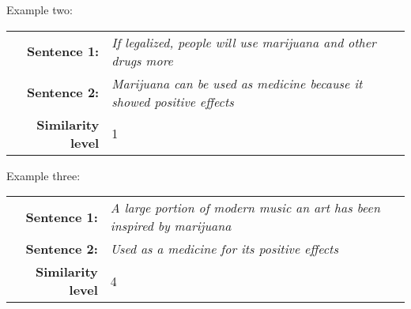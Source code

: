 \noindent Example two:
\begin{table}[h!]
\begin{tabular}{|@{\ }r@{\ \  }p{}|}
\hline
\textbf{Sentence 1:} & \emph{If legalized, people will use marijuana and other drugs more}\\
\textbf{Sentence 2:} & \emph{Marijuana can be used as medicine because it showed positive effects}\\
\textbf{Similarity level} & 1 \\
\hline
\end{tabular}
\end{table}

\noindent Example three:
\begin{table}[h!]
\begin{tabular}{|@{\ }r@{\ \  }p{}|}
\hline
\textbf{Sentence 1:} & \emph{A large portion of modern music an art has been inspired by marijuana}\\
\textbf{Sentence 2:} & \emph{Used as a medicine for its positive effects}\\
\textbf{Similarity level} & 4 \\
\hline
\end{tabular}
\end{table}
